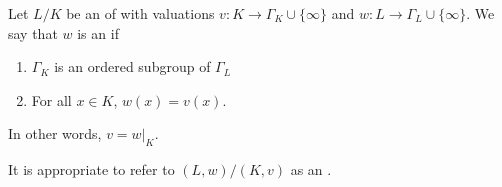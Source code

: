 \begin{definition} \label{definition:extension_of_a_valuation_of_a_field_to_an_extension_field}
    Let $L/K$ be an  of  with valuations $v: K \to \Gamma_K \cup \{\infty\}$ and $w : L \to \Gamma_L \cup \{\infty\}$. 
    We say that $w$ is an  if 
    \begin{enumerate}
        \item $\Gamma_K$ is an ordered subgroup of $\Gamma_L$
        \item For all $x \in K$, $w(x) = v(x)$. 
    \end{enumerate}
    In other words, $v = w|_K$. 

    It is appropriate to refer to $(L,w) / (K,v)$ as an .
\end{definition}